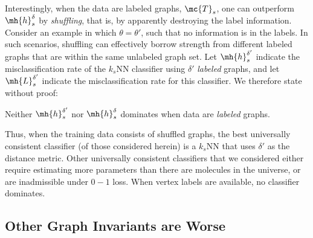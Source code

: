 \documentclass[10pt,journal,cspaper,compsoc]{IEEEtran}
\begin{document}

Interestingly, when the data are labeled graphs, $\mc{T}_s$, one can outperform $\mh{h}_s^{\delta}$ by \emph{shuffling}, that is, by apparently destroying the label information.  Consider an example in which $\theta=\theta'$, such that no information is in the labels.  In such scenarios, shuffling can effectively borrow strength from different labeled graphs that are within the same unlabeled graph set. Let $\mh{h}^{\delta'}_s$ indicate the misclassification rate of the $k_s$NN classifier using $\delta'$ \emph{labeled} graphs, and let $\mh{L}^{\delta'}_s$ indicate the misclassification rate for this classifier. We therefore state without proof:
\begin{thm} \label{thm:nodom}
	Neither $\mh{h}_s^{\delta'}$ nor $\mh{h}_s^{\delta}$ dominates when data are \emph{labeled} graphs.
\end{thm}



Thus, when the training data consists of shuffled graphs, the best universally consistent classifier (of those considered herein) is a $k_s$NN that uses $\delta'$ as the distance metric.  Other universally consistent classifiers that we considered either require estimating more parameters than there are molecules in the universe, or are inadmissible under $0-1$ loss.  When vertex labels are available, no classifier dominates. 


\subsection{Other Graph Invariants are Worse} %
\label{sub:asymptotically_optimal_classifiers}

\end{document}
